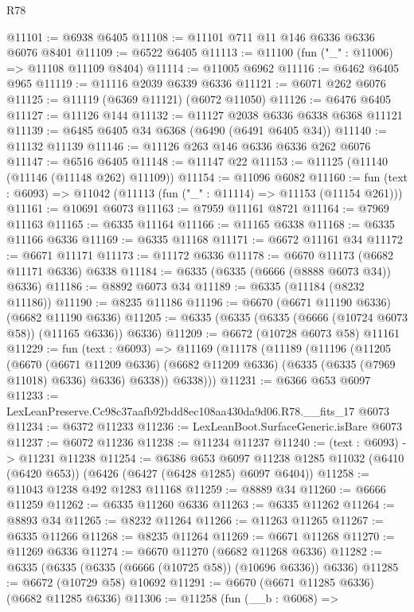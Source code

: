 \begin{lexlean}{R78}
\begin{coremodule}
@11101 := @6938 @6405
@11108 := @11101 @711 @11 @146 @6336 @6336 @6076 @8401
@11109 := @6522 @6405
@11113 := @11100 (fun ("_" : @11006) => @11108 @11109 @8404)
@11114 := @11005 @6962
@11116 := @6462 @6405 @965
@11119 := @11116 @2039 @6339 @6336
@11121 := @6071 @262 @6076
@11125 := @11119 (@6369 @11121) (@6072 @11050)
@11126 := @6476 @6405
@11127 := @11126 @144
@11132 := @11127 @2038 @6336 @6338 @6368 @11121
@11139 := @6485 @6405 @34 @6368 (@6490 (@6491 @6405 @34))
@11140 := @11132 @11139
@11146 := @11126 @263 @146 @6336 @6336 @262 @6076
@11147 := @6516 @6405
@11148 := @11147 @22
@11153 := @11125 (@11140 (@11146 (@11148 @262) @11109))
@11154 := @11096 @6082
@11160 := fun (text : @6093) => @11042 (@11113 (fun ("_" : @11114) => @11153 (@11154 @261)))
@11161 := @10691 @6073
@11163 := @7959 @11161 @8721
@11164 := @7969 @11163
@11165 := @6335 @11164
@11166 := @11165 @6338
@11168 := @6335 @11166 @6336
@11169 := @6335 @11168
@11171 := @6672 @11161 @34
@11172 := @6671 @11171
@11173 := @11172 @6336
@11178 := @6670 @11173 (@6682 @11171 @6336) @6338
@11184 := @6335 (@6335 (@6666 (@8888 @6073 @34)) @6336)
@11186 := @8892 @6073 @34
@11189 := @6335 (@11184 (@8232 @11186))
@11190 := @8235 @11186
@11196 := @6670 (@6671 @11190 @6336) (@6682 @11190 @6336)
@11205 := @6335 (@6335 (@6335 (@6666 (@10724 @6073 @58)) (@11165 @6336)) @6336)
@11209 := @6672 (@10728 @6073 @58) @11161
@11229 := fun (text : @6093) =>
  @11169
    (@11178
      (@11189
        (@11196
          (@11205
            (@6670
              (@6671 @11209 @6336)
              (@6682 @11209 @6336)
              (@6335 (@6335 (@7969 @11018) @6336) @6336)
              @6338))
          @6338)))
@11231 := @6366 @653 @6097
@11233 := LexLeanPreserve.Cc98c37aafb92bdd8ec108aa430da9d06.R78.__fits_17 @6073
@11234 := @6372 @11233
@11236 := LexLeanBoot.SurfaceGeneric.isBare @6073
@11237 := @6072 @11236
@11238 := @11234 @11237
@11240 := (text : @6093) -> @11231 @11238
@11254 := @6386
    @653
    @6097
    @11238
    @1285
    @11032
    (@6410 (@6420 @653))
    (@6426 (@6427 (@6428 @1285) @6097 @6404))
@11258 := @11043 @1238 @492 @1283 @11168
@11259 := @8889 @34
@11260 := @6666 @11259
@11262 := @6335 @11260 @6336
@11263 := @6335 @11262
@11264 := @8893 @34
@11265 := @8232 @11264
@11266 := @11263 @11265
@11267 := @6335 @11266
@11268 := @8235 @11264
@11269 := @6671 @11268
@11270 := @11269 @6336
@11274 := @6670 @11270 (@6682 @11268 @6336)
@11282 := @6335 (@6335 (@6335 (@6666 (@10725 @58)) (@10696 @6336)) @6336)
@11285 := @6672 (@10729 @58) @10692
@11291 := @6670 (@6671 @11285 @6336) (@6682 @11285 @6336)
@11306 := @11258
    (fun (__b : @6068) =>

\end{coremodule}
\end{lexlean}
